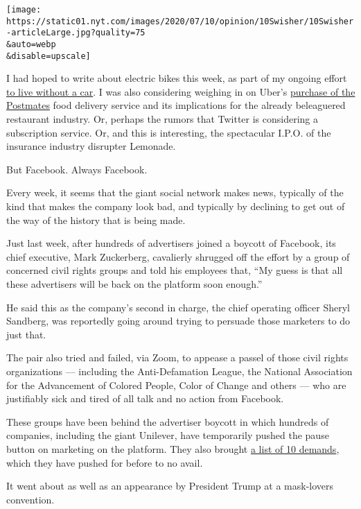 \texttt{[image: https://static01.nyt.com/images/2020/07/10/opinion/10Swisher/10Swisher-articleLarge.jpg?quality=75\\\&auto=webp\\\&disable=upscale]}

I had hoped to write about electric bikes this week, as part of my
ongoing effort
\href{https://www.nytimes.com/2020/07/09/opinion/ban-cars-manhattan-cities.html}{to
live without a car}. I was also considering weighing in on Uber's
\href{https://www.nytimes.com/2020/07/05/technology/uber-postmates-deal.html?searchResultPosition=1}{purchase
of the Postmates} food delivery service and its implications for the
already beleaguered restaurant industry. Or, perhaps the rumors that
Twitter is considering a subscription service. Or, and this is
interesting, the spectacular I.P.O. of the insurance industry disrupter
Lemonade.

But Facebook. Always Facebook.

Every week, it seems that the giant social network makes news, typically
of the kind that makes the company look bad, and typically by declining
to get out of the way of the history that is being made.

Just last week, after hundreds of advertisers joined a boycott of
Facebook, its chief executive, Mark Zuckerberg, cavalierly shrugged off
the effort by a group of concerned civil rights groups and told his
employees that, ``My guess is that all these advertisers will be back on
the platform soon enough.''

He said this as the company's second in charge, the chief operating
officer Sheryl Sandberg, was reportedly going around trying to persuade
those marketers to do just that.

The pair also tried and failed, via Zoom, to appease a passel of those
civil rights organizations --- including the Anti-Defamation League, the
National Association for the Advancement of Colored People, Color of
Change and others --- who are justifiably sick and tired of all talk and
no action from Facebook.

These groups have been behind the advertiser boycott in which hundreds
of companies, including the giant Unilever, have temporarily pushed the
pause button on marketing on the platform. They also brought
\href{https://www.nytimes.com/2020/07/07/technology/facebook-ad-boycott-civil-rights.html}{a
list of 10 demands}, which they have pushed for before to no avail.

It went about as well as an appearance by President Trump at a
mask-lovers convention.

